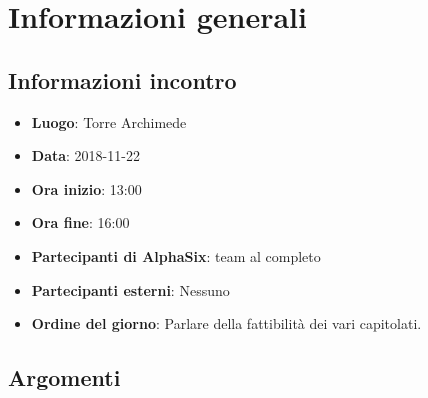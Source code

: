 \newcommand{\documento}{\VI}
\newcommand{\nomedocumentofisico}{VI\_2018-11-22.pdf}
\newcommand{\redazione}{\LC}
\newcommand{\verifica}{\NC}
\newcommand{\approvazione}{\CV}
\newcommand{\versione}{1.0.0}
\newcommand{\uso}{Interno}
\newcommand{\destinateTo}{\gruppo}
\newcommand{\datacreazione}{25 novembre 2018}
\newcommand{\datamodifica}{26 novembre 2018}
\newcommand{\stato}{Approvato}

\def\TABELLE{false}	%
\def\FIGURE{false} 	%






    

    	
    
    \section{Informazioni generali}
		\subsection{Informazioni incontro}
			\begin{itemize}
				\item { \textbf{Luogo}:  Torre Archimede}
				\item { \textbf{Data}: 2018-11-22}
				\item { \textbf{Ora inizio}: 13:00}
				\item { \textbf{Ora fine}: 16:00}
				\item { \textbf{Partecipanti di AlphaSix}: team al completo}
				\item { \textbf{Partecipanti esterni}: Nessuno}
				\item { \textbf{Ordine del giorno}: Parlare della fattibilità dei vari capitolati.}
			\end{itemize}

        \subsection{Argomenti}
